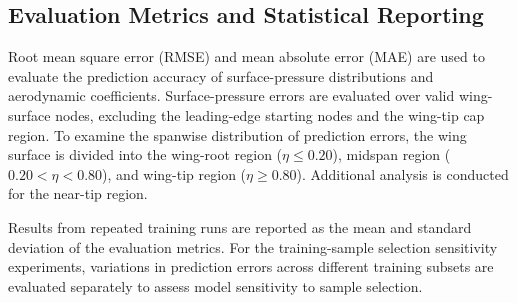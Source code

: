 
\subsection{Evaluation Metrics and Statistical Reporting}
\label{subsec:evaluation-metrics}

Root mean square error (RMSE) and mean absolute error (MAE) are used to evaluate the prediction accuracy of surface-pressure distributions and aerodynamic coefficients. Surface-pressure errors are evaluated over valid wing-surface nodes, excluding the leading-edge starting nodes and the wing-tip cap region. To examine the spanwise distribution of prediction errors, the wing surface is divided into the wing-root region ($\eta \leq 0.20$), midspan region ($0.20 < \eta < 0.80$), and wing-tip region ($\eta \geq 0.80$). Additional analysis is conducted for the near-tip region.

Results from repeated training runs are reported as the mean and standard deviation of the evaluation metrics. For the training-sample selection sensitivity experiments, variations in prediction errors across different training subsets are evaluated separately to assess model sensitivity to sample selection.
